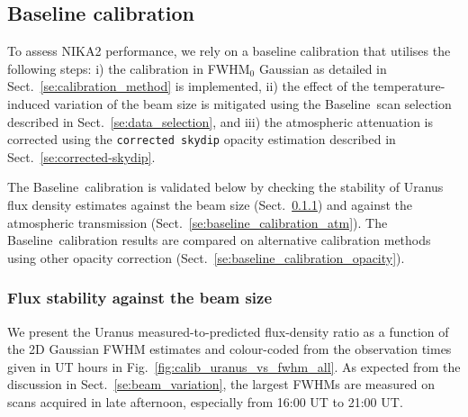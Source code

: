\documentclass[traditionalabstract]{aa}
\newcommand{\baseline}{Baseline}%
\newcommand{\lp}[1]{#1}
\begin{document}
{\subsection{Baseline calibration}
\label{se:baseline_calibration}

To assess NIKA2 performance, we rely on a baseline calibration that
utilises the following steps: i) the calibration in FWHM$_0$ Gaussian
as detailed in Sect.~\ref{se:calibration_method} is implemented, ii)
the effect of the temperature-induced variation of the beam size is
mitigated using the \baseline\ scan selection described in
Sect.~\ref{se:data_selection}, and iii) the
atmospheric attenuation is corrected using the {\tt corrected skydip}
opacity estimation described in Sect.~\ref{se:corrected-skydip}.

The \baseline\ calibration is validated below by checking the
stability of Uranus flux density estimates against the beam size
(Sect.~\ref{se:baseline_calibration_scans}) and against the
atmospheric transmission
(Sect.~\ref{se:baseline_calibration_atm}). The \baseline\
calibration results are compared on alternative calibration methods
using other opacity correction (Sect.~\ref{se:baseline_calibration_opacity}).


\subsubsection{Flux stability against the beam size}
\label{se:baseline_calibration_scans}

We present the Uranus measured-to-predicted flux-density ratio as a
function of the 2D Gaussian FWHM estimates and colour-coded from the
observation times given in UT hours in
Fig.~\ref{fig:calib_uranus_vs_fwhm_all}. {\lp As expected from the
discussion in Sect.~\ref{se:beam_variation}, the largest FWHMs are
measured on scans acquired in late afternoon, especially from 16:00 UT
to 21:00 UT.}  


}
\end{document}
